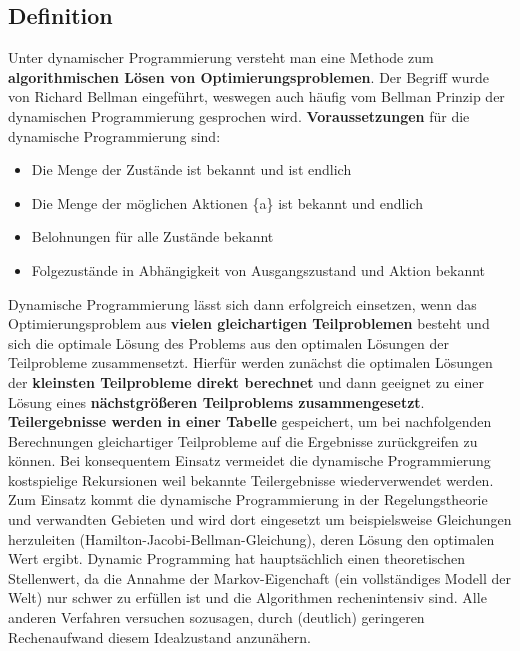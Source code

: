 \documentclass[10pt]{scrartcl}
\begin{document}
\subsection{Definition}
Unter dynamischer Programmierung versteht man eine Methode zum \textbf{algorithmischen Lösen von Optimierungsproblemen}. Der Begriff wurde von Richard Bellman eingeführt, weswegen auch häufig vom \glqq Bellman Prinzip der dynamischen Programmierung gesprochen\grqq\xspace wird. \textbf{Voraussetzungen} für die dynamische Programmierung sind:

\begin{itemize}
\item{Die Menge der Zustände ist bekannt und ist endlich}
\item{Die Menge der möglichen Aktionen \{a\} ist bekannt und endlich}
\item{Belohnungen für alle Zustände bekannt}
\item{Folgezustände in Abhängigkeit von Ausgangszustand und Aktion bekannt}
\end{itemize}



Dynamische Programmierung lässt sich dann erfolgreich einsetzen, wenn das Optimierungsproblem aus \textbf{vielen gleichartigen Teilproblemen} besteht und sich die optimale Lösung des Problems aus den optimalen Lösungen der Teilprobleme zusammensetzt. Hierfür werden zunächst die optimalen Lösungen der \textbf{kleinsten Teilprobleme direkt berechnet} und dann geeignet zu einer Lösung eines \textbf{nächstgrößeren Teilproblems zusammengesetzt}. \textbf{Teilergebnisse werden in einer Tabelle} gespeichert, um bei nachfolgenden Berechnungen gleichartiger Teilprobleme auf die Ergebnisse zurückgreifen zu können. Bei konsequentem Einsatz vermeidet die dynamische Programmierung kostspielige Rekursionen weil bekannte Teilergebnisse wiederverwendet werden.\\
Zum Einsatz kommt die dynamische Programmierung in der Regelungstheorie und verwandten Gebieten und wird dort eingesetzt um beispielsweise Gleichungen herzuleiten (Hamilton-Jacobi-Bellman-Gleichung), deren Lösung den optimalen Wert ergibt.
Dynamic Programming hat hauptsächlich einen theoretischen Stellenwert, da die Annahme der Markov-Eigenchaft
(ein vollständiges Modell der Welt) nur schwer zu erfüllen ist und die Algorithmen rechenintensiv
sind. Alle anderen Verfahren versuchen sozusagen, durch (deutlich) geringeren Rechenaufwand
diesem Idealzustand anzunähern. 
\end{document}
